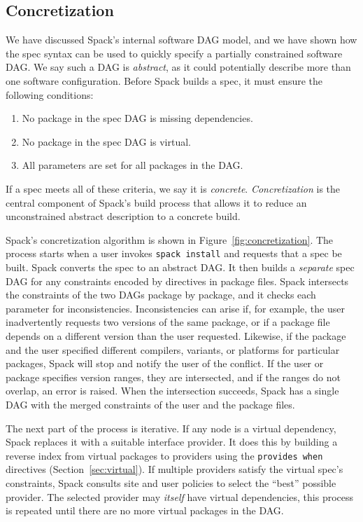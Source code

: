 
\subsection{Concretization}
\label{sec:concretization}

We have discussed Spack's internal software DAG model, and we have shown
how the spec syntax can be used to quickly specify a partially constrained
software DAG.  We say such a DAG is {\it abstract}, as it could potentially
describe more than one software configuration. Before Spack builds a spec, it
must ensure the following conditions:
\begin{enumerate}
\item No package in the spec DAG is missing dependencies.
\item No package in the spec DAG is virtual.
\item All parameters are set for all packages in the DAG.
\end{enumerate}
If a spec meets all of these criteria, we say it is {\it concrete}.
{\it Concretization} is the central component of Spack's build
process that allows it to reduce an unconstrained abstract
description to a concrete build.

Spack's concretization algorithm is shown in Figure~\ref{fig:concretization}.
The process starts when a user invokes {\tt spack install} and requests that a
spec be built.  Spack converts the spec to an abstract DAG.
It then builds a {\it separate} spec DAG for any constraints encoded
by directives in package files.
%
Spack intersects the constraints of the two DAGs package by package, and it
checks each parameter for inconsistencies.  Inconsistencies can arise if, for example,
the user inadvertently requests two versions of the same package, or if a
package file depends on a different version than the user requested.
Likewise, if the package and the user specified different compilers, variants,
or platforms for particular packages, Spack will stop and notify
the user of the conflict. If the user or package specifies version ranges,
they are intersected, and if the ranges do not overlap, an error is raised.
When the intersection succeeds, Spack has a single DAG with the merged
constraints of the user and the package files.

The next part of the process is iterative.
If any node is a virtual dependency, Spack replaces it with a
suitable interface provider.  It does this by building a reverse
index from virtual packages to providers using the {\tt provides when}
directives (Section~\ref{sec:virtual}). If multiple providers
satisfy the virtual spec's constraints,
Spack consults site and user policies to select the ``best'' possible
provider.  The selected provider may {\it itself} have virtual dependencies,
this process is repeated until there are no more virtual packages in the DAG.

